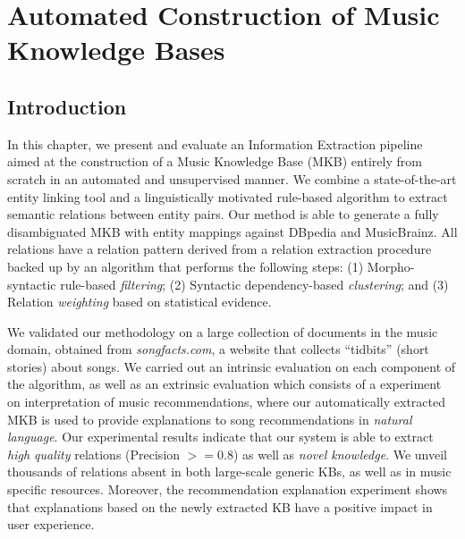 
\chapter[Automated Construction of Music Knowledge Bases][Automated Construction of MKBs]{Automated Construction of Music Knowledge Bases}
\label{sec:kb}

\section{Introduction}\label{sec:kb:introduction}

In this chapter, we present and evaluate an Information Extraction pipeline aimed at the construction of a Music Knowledge Base (MKB) entirely from scratch in an automated and unsupervised manner.
We combine a state-of-the-art entity linking tool and a linguistically motivated rule-based algorithm to extract semantic relations between entity pairs. 
Our method is able to generate a fully disambiguated MKB with entity mappings against DBpedia and MusicBrainz. All relations have a relation pattern derived from a relation extraction procedure backed up by an algorithm that performs the following steps: (1) Morpho-syntactic rule-based \textit{filtering}; (2) Syntactic dependency-based \textit{clustering}; and (3) Relation \textit{weighting} based on statistical evidence. 

We validated our methodology on a large collection of documents in the music domain, obtained from \textit{songfacts.com}, a website that collects ``tidbits'' (short stories) about songs.
We carried out an intrinsic evaluation on each component of the algorithm, as well as an extrinsic evaluation which consists of a experiment on interpretation of music recommendations, where our automatically extracted MKB is used to provide explanations to song recommendations in \textit{natural language}.
Our experimental results indicate that our system is able to extract \textit{high quality} relations (Precision $>= 0.8$) as well as \textit{novel knowledge}. We unveil thousands of relations absent in both large-scale generic KBs, as well as in music specific resources. Moreover, the recommendation explanation experiment shows that explanations based on the newly extracted KB have a positive impact in user experience.


